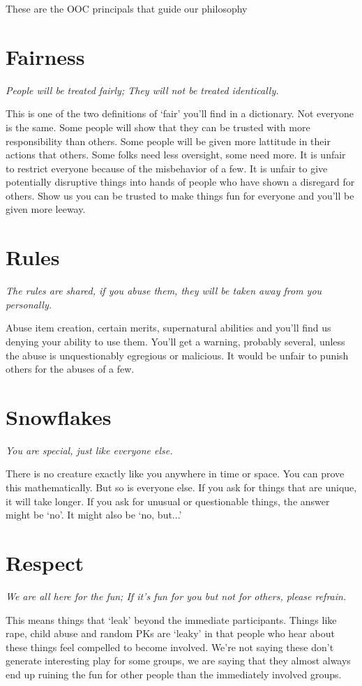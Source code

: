 These are the OOC principals that guide our philosophy
\section{Fairness}
{\em People will be treated fairly; They will not be treated identically.}

This is one of the two definitions of `fair' you'll find in a
dictionary. Not everyone is the same. Some people will show that they
can be trusted with more responsibility than others. Some people will be
given more lattitude in their actions that others. Some folks need less
oversight, some need more. It is unfair to restrict everyone because of
the misbehavior of a few. It is unfair to give potentially disruptive
things into hands of people who have shown a disregard for others. Show
us you can be trusted to make things fun for everyone and you'll be
given more leeway.
\section{Rules}
{\em The rules are shared, if you abuse them, they will be taken away from you personally.}

Abuse item creation, certain merits, supernatural abilities and you'll
find us denying your ability to use them. You'll get a warning, probably
several, unless the abuse is unquestionably egregious or malicious. It
would be unfair to punish others for the abuses of a few.
\section{Snowflakes}
{\em You are special, just like everyone else.}

There is no creature exactly like you anywhere in time or space. You
can prove this mathematically. But so is everyone else. If you ask for
things that are unique, it will take longer. If you ask for unusual
or questionable things, the answer might be `no'. It might also be
`no, but...'
\section{Respect}
{\em We are all here for the fun; If it's fun for you but not for others, please refrain.}

This means things that `leak' beyond the immediate participants. Things
like rape, child abuse and random PKs are `leaky' in that people who
hear about these things feel compelled to become involved. We're not
saying these don't generate interesting play for some groups, we are
saying that they almost always end up ruining the fun for other people
than the immediately involved groups.
